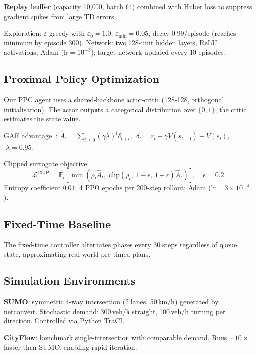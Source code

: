 \documentclass[twoside,11pt]{article}
\begin{document}
\textbf{Replay buffer} (capacity 10,000, batch 64) combined with
Huber loss to suppress gradient spikes from large TD errors.

Exploration: $\varepsilon$-greedy with $\varepsilon_0{=}1.0$,
$\varepsilon_{\min}{=}0.05$, decay $0.99$/episode (reaches minimum by
episode 300).  Network: two 128-unit hidden layers, ReLU activations,
Adam ($\text{lr}=10^{-3}$); target network updated every 10 episodes.

\subsection{Proximal Policy Optimization}

Our PPO agent uses a shared-backbone actor-critic (128-128, orthogonal
initialisation).  The actor outputs a categorical distribution over $\{0,1\}$;
the critic estimates the state value.

GAE advantage~\citep{schulman2015high}:
$\hat{A}_t = \sum_{l \ge 0}(\gamma\lambda)^l\delta_{t+l}$,
$\;\delta_t = r_t + \gamma V(s_{t+1}) - V(s_t)$, $\;\lambda{=}0.95$.

Clipped surrogate objective:
\begin{equation}
\mathcal{L}^{\text{CLIP}} =
\mathbb{E}_t\!\left[\min\!\left(
  \rho_t\hat{A}_t,\;
  \text{clip}(\rho_t,\,1{-}\epsilon,\,1{+}\epsilon)\hat{A}_t
\right)\right], \quad \epsilon=0.2
\end{equation}
Entropy coefficient $0.01$; 4 PPO epochs per 200-step rollout;
Adam ($\text{lr}=3\times10^{-4}$).

\subsection{Fixed-Time Baseline}

The fixed-time controller alternates phases every 30 steps regardless of
queue state, approximating real-world pre-timed plans.

\subsection{Simulation Environments}

\textbf{SUMO}: symmetric 4-way intersection (2 lanes, 50\,km/h) generated by
netconvert.  Stochastic demand: 300\,veh/h straight, 100\,veh/h turning per
direction.  Controlled via Python TraCI.

\textbf{CityFlow}: benchmark single-intersection with comparable demand.
Runs ${\sim}10{\times}$ faster than SUMO, enabling rapid iteration.
\end{document}
